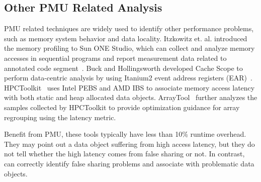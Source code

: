 \subsection{Other PMU Related Analysis}

PMU related techniques are widely used to identify other performance problems, such as memory system behavior and data locality. Itzkowitz et. al. introduced the memory profiling to Sun ONE Studio, which can collect and analyze memory accesses in sequential programs and report measurement data related to annotated code segment~\cite{DBLP:conf/sc/ItzkowitzWAK03}. Buck and Hollingsworth developed Cache Scope to perform data-centric analysis by using Itanium2 event address registers (EAR)~\cite{DBLP:conf/sc/BuckH04}. HPCToolkit~\cite{ibs-sc} uses Intel PEBS and AMD IBS to associate memory access latency with both static and heap allocated data objects. ArrayTool~\cite{ibs-pact} further analyzes the samples collected by HPCToolkit to provide optimization guidance for array regrouping using the latency metric. 

Benefit from PMU, these tools typically have less than 10\% runtime overhead. They may point out a data object suffering from high access latency, but they do not tell whether the high latency comes from false sharing or not. In contrast, \cheetah{} can correctly identify false sharing problems and associate with problematic data objects.





